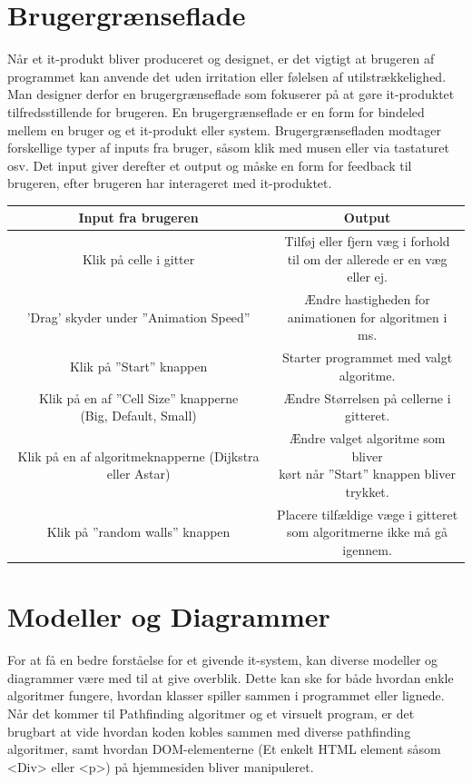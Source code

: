 \documentclass[12pt]{article}
\begin{document}
\section{Brugergrænseflade}
Når et it-produkt bliver produceret og designet, er det vigtigt at brugeren af programmet kan anvende det uden irritation eller følelsen af utilstrækkelighed. Man designer derfor en brugergrænseflade som fokuserer på at gøre it-produktet tilfredsstillende for brugeren.
En brugergrænseflade er en form for bindeled mellem en bruger og et it-produkt eller system. Brugergrænsefladen modtager forskellige typer af inputs fra bruger, såsom klik med musen eller via tastaturet osv. Det input giver derefter et output og måske en form for feedback til brugeren, efter brugeren har interageret med it-produktet. 
\begin{table}[ht]
  {\renewcommand{\arraystretch}{1.2} %
  \begin{tabular}{ |c|c| }
   \hline
   \textbf{Input fra brugeren} & \textbf{Output} \\ 
   \hline
   Klik på celle i gitter & \shortstack{Tilføj eller fjern væg i forhold \\ til om der allerede er en væg eller ej.} \\
   \hline
   ’Drag’ skyder under ”Animation Speed” & \shortstack{Ændre hastigheden for \\ animationen for algoritmen i ms.} \\
   \hline
   Klik på ”Start” knappen & Starter programmet med valgt algoritme. \\
   \hline
   \shortstack{Klik på en af ”Cell Size” knapperne \\(Big, Default, Small)} & Ændre Størrelsen på cellerne i gitteret. \\
   \hline
   Klik på en af algoritmeknapperne (Dijkstra eller Astar) & \shortstack{Ændre valget algoritme som bliver \\kørt når ”Start” knappen bliver trykket.} \\
   \hline
   Klik på ”random walls” knappen & \shortstack{Placere tilfældige væge i gitteret \\ som algoritmerne ikke må gå igennem.} \\
   \hline
  \end{tabular}}
\end{table}
\section{Modeller og Diagrammer}
For at få en bedre forståelse for et givende it-system, kan diverse modeller og diagrammer være med til at give overblik. 
Dette kan ske for både hvordan enkle algoritmer fungere, hvordan klasser spiller sammen i programmet eller lignede. Når det kommer til Pathfinding algoritmer og et virsuelt program, 
er det brugbart at vide 
hvordan koden kobles sammen med diverse pathfinding algoritmer, samt hvordan DOM-elementerne (Et enkelt HTML element såsom <Div> eller <p>) på hjemmesiden bliver manipuleret. 
\end{document}
